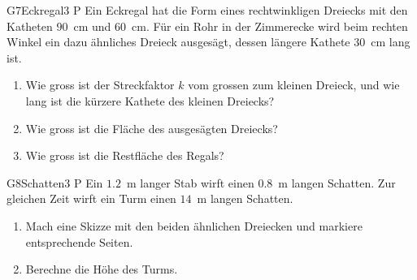\documentclass[11pt]{article}
\begin{document}

\begin{lpaufgabe}{G7}{Eckregal}{3 P}
Ein Eckregal hat die Form eines rechtwinkligen Dreiecks mit den Katheten $90$~cm und $60$~cm. Für ein Rohr in der Zimmerecke wird
beim rechten Winkel ein dazu ähnliches Dreieck ausgesägt, dessen längere Kathete $30$~cm lang ist.
\begin{center}
\end{center}
\begin{enumerate}[label=(\alph*),leftmargin=*,itemsep=3pt]
\item Wie gross ist der Streckfaktor $k$ vom grossen zum kleinen Dreieck, und wie lang ist die kürzere Kathete des kleinen Dreiecks?
\item Wie gross ist die Fläche des ausgesägten Dreiecks?
\item Wie gross ist die Restfläche des Regals?
\end{enumerate}
\end{lpaufgabe}

\begin{lpaufgabe}{G8}{Schatten}{3 P}
Ein $1.2$~m langer Stab wirft einen $0.8$~m langen Schatten. Zur gleichen Zeit wirft ein Turm einen $14$~m langen Schatten.
\begin{enumerate}[label=(\alph*),leftmargin=*,itemsep=3pt]
\item Mach eine Skizze mit den beiden ähnlichen Dreiecken und markiere entsprechende Seiten.
\item Berechne die Höhe des Turms.
\end{enumerate}
\end{lpaufgabe}
\end{document}
